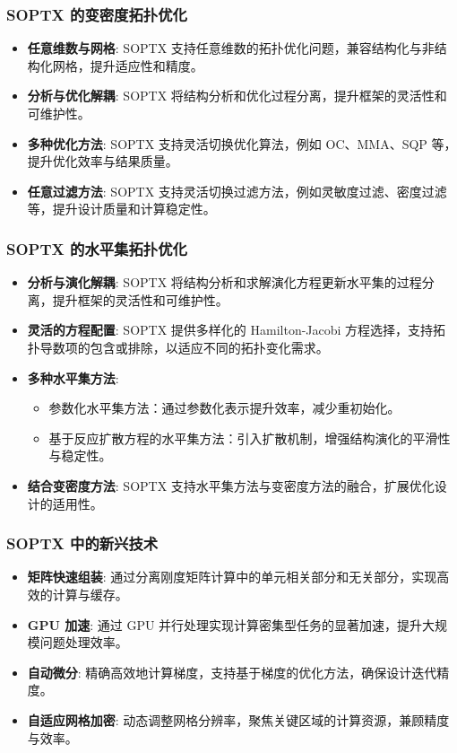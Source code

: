 \documentclass{beamer}  %
\numberwithin{subsection}{section}             %
\begin{document}
\begin{frame}
\frametitle{SOPTX 的变密度拓扑优化}
\small{
\begin{itemize}
	\item \textbf{任意维数与网格}: SOPTX 支持任意维数的拓扑优化问题，兼容结构化与非结构化网格，提升适应性和精度。
		
	\item \textbf{分析与优化解耦}: SOPTX 将结构分析和优化过程分离，提升框架的灵活性和可维护性。
	
	\item \textbf{多种优化方法}: SOPTX 支持灵活切换优化算法，例如 OC、MMA、SQP 等，提升优化效率与结果质量。
	
	\item \textbf{任意过滤方法}: SOPTX 支持灵活切换过滤方法，例如灵敏度过滤、密度过滤等，提升设计质量和计算稳定性。
\end{itemize}
}
\end{frame}

\begin{frame}
\frametitle{SOPTX 的水平集拓扑优化}
\small{
	\begin{itemize}
		\item \textbf{分析与演化解耦}: SOPTX 将结构分析和求解演化方程更新水平集的过程分离，提升框架的灵活性和可维护性。
		
		\item \textbf{灵活的方程配置}: SOPTX 提供多样化的 Hamilton-Jacobi 方程选择，支持拓扑导数项的包含或排除，以适应不同的拓扑变化需求。
		
		\item \textbf{多种水平集方法}: 
		\begin{itemize}
			\item 参数化水平集方法：通过参数化表示提升效率，减少重初始化。
			
			\item 基于反应扩散方程的水平集方法：引入扩散机制，增强结构演化的平滑性与稳定性。
		\end{itemize}
		
		\item \textbf{结合变密度方法}: SOPTX 支持水平集方法与变密度方法的融合，扩展优化设计的适用性。
	\end{itemize}
}
\end{frame}

\begin{frame}
\frametitle{SOPTX 中的新兴技术}
\small{
\begin{itemize}
	\item \textbf{矩阵快速组装}: 通过分离刚度矩阵计算中的单元相关部分和无关部分，实现高效的计算与缓存。
	
	\item \textbf{GPU 加速}: 通过 GPU 并行处理实现计算密集型任务的显著加速，提升大规模问题处理效率。
	
	\item \textbf{自动微分}: 精确高效地计算梯度，支持基于梯度的优化方法，确保设计迭代精度。
	
	\item \textbf{自适应网格加密}: 动态调整网格分辨率，聚焦关键区域的计算资源，兼顾精度与效率。
\end{itemize}
}
\end{frame}
\end{document}
